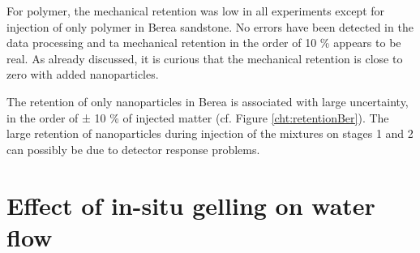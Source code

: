 For polymer, the mechanical retention was low in all experiments except for injection of only polymer in Berea sandstone. No errors have been detected in the data processing and ta mechanical retention in the order of 10 \% appears to be real. As already discussed, it is curious that the mechanical retention is close to zero with added nanoparticles. 

The retention of only nanoparticles in Berea is associated with large uncertainty, in the order of ± 10 \% of injected matter (cf. Figure \ref{cht:retentionBer}). The large retention of nanoparticles during injection of the mixtures on stages 1 and 2 can possibly be due to detector response problems. 


\section{ Effect of in-situ gelling on water flow}